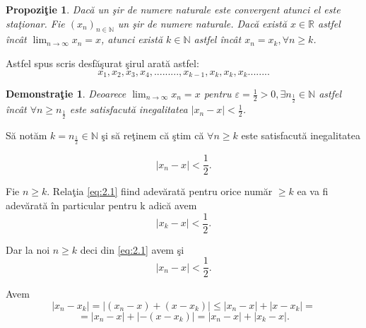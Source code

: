 \documentclass[a4paper,12pt,oneside]{report}
\newtheorem{proposition}{Propozi\c tie}
\newtheorem{demonstration}{Demonstra\c tie}
\begin{document}
	
\begin{proposition}
  Dac\u a un \c sir de numere naturale este convergent atunci el este sta\c tionar. 
Fie \((x_{n})_{n\in \mathbb{N}}\) un \c sir de numere naturale. Dac\u a exist\u a \(x\in \mathbb{R}\) astfel \^ inc\^ at \(\lim_{n \to \infty }x_{n}= x\), atunci exist\u a \(k\in \mathbb{N}\) astfel \^ inc\^ at \(x_{n}= x_{k}, \forall n\geq k\).
\end{proposition}

	
Astfel spus scris desf\u a\c surat \c sirul arat\u a astfel:
\begin{displaymath}
x_{1},x_{2},x_{3},x_{4},.........,x_{k-1},x_{k},x_{k},x_{k}........
\end{displaymath}


\begin{demonstration}
  Deoarece \(\lim_{n \to \infty }x_{n}= x\) pentru \(\varepsilon = \frac{1}{2}> 0, \exists n_{\frac{1}{2}}\in \mathbb{N}\) astfel \^ inc\^ at \(\forall n\geq n_{\frac{1}{2}}\) este satisfacut\u a inegalitatea \(\left | x_{n} -x \right |<  \frac{1}{2}\). 
\end{demonstration}
	
S\u a not\u am \(k=n_{\frac{1}{2}}\in \mathbb{N}\) \c si s\u a re\c tinem c\u a \c stim c\u a \(\forall n\geq k \) este satisfacut\u a inegalitatea 

\begin{displaymath}
  \left | x_{n} -x \right |< \frac{1}{2}. \label{eq:2.1} \tag{2.1} 
\end{displaymath}


Fie \(n\geq k\). Rela\c tia \ref{eq:2.1} fiind adev\u arat\u a pentru orice num\u ar \(\geq k\) ea va fi adev\u arat\u a \^ in particular pentru k adic\u a avem 
\begin{displaymath}
  \left | x_{k}-x \right |< \frac{1}{2}. \label{eq:2.2} \tag{2.2}
\end{displaymath}


Dar la noi \(n\geq k\) deci din \ref{eq:2.1} avem \c si 
\begin{displaymath}
  \left | x_{n}-x \right |< \frac{1}{2}.\label{eq:2.3} \tag{2.3}
\end{displaymath}


Avem 
\begin{displaymath}
  \left | x_{n}-x_{k} \right |= \left | (x_{n}-x)+(x-x_{k}) \right |\leq \left | x_{n}-x \right |+\left | x-x_{k} \right |= 
\end{displaymath}
\begin{displaymath}
  =\left | x_{n}-x \right |+ \left | -(x-x_{k}) \right |= \left | x_{n}-x \right |+ \left | x_{k} -x\right |. \label{eq:2.4} \tag{2.4}
\end{displaymath}
\end{document}

